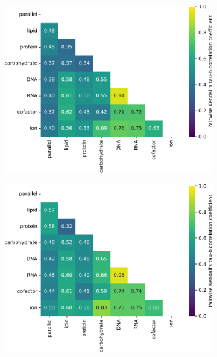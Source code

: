 \begin{figure}
  \centering
  \begin{subfigure}[t]{0.45\textwidth}
  \centering
    \includegraphics[width=\linewidth]{CompareEnzUse_glc00p00_pyr03p73_amm00p90_2.pdf}
    \caption{
    }
    \label{fig:model-rank-pyr-highratio-kendall}
  \end{subfigure}%
  \begin{subfigure}[t]{0.45\textwidth}
  \centering
    \includegraphics[width=\linewidth]{CompareEnzUse_glc00p00_pyr08p89_ammUnres_2.pdf}
    \caption{
    }
    \label{fig:model-rank-pyr-lowratio-kendall}
  \end{subfigure}


\end{figure}
